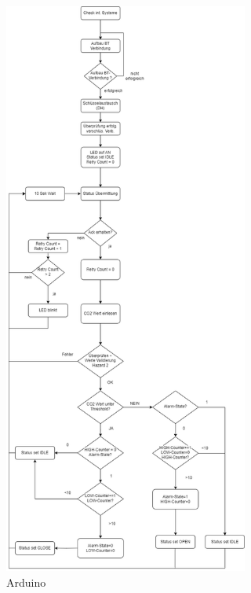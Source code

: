 \begin{figure}[h]
	\includegraphics[height=190mm,left]{images/ablaufdiag_adriuno.drawio.png}
	\centering
	\caption{Arduino}
	\label{fig:system}
\end{figure}